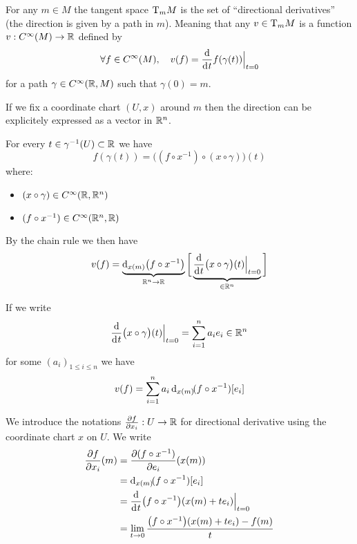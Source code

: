 		For any $m \in M$ the tangent space $\mathrm{T}_m{M}$ is the set of ``directional derivatives'' (the direction is given by a path in $m$).
		Meaning that any $v \in \mathrm{T}_m{M}$ is a function $v: C^\infty(M) \to \mathbb{R}$ defined by
		$$
			\forall f \in \Cinf(M), \quad v(f) = \frac{\d}{\di{t}} f(\gamma(t)) \Big|_{t=0}
		$$
		for a path $\gamma \in C^\infty(\mathbb{R}, M)$ such that $\gamma(0) = m$.



		If we fix a coordinate chart $(U, x)$ around $m$ then the direction can be explicitely expressed as a vector in $\mathbb{R}^n$.

		For every $t \in \gamma^{-1}(U) \subset \mathbb{R}$ we have
		$$
			f(\gamma(t)) = \big( (f \circ x^{-1}) \circ (x \circ \gamma) \big)(t)
		$$
		where:
		\begin{itemize}
			\item $(x \circ \gamma) \in C^\infty(\mathbb{R}, \mathbb{R}^n)$
			\item $(f \circ x^{-1}) \in C^\infty(\mathbb{R}^n, \mathbb{R})$
		\end{itemize}
		By the chain rule we then have
		$$
			v(f) = \underbrace{\di[x(m)] \big( f \circ x^{-1} \big)}_{\R^n \to \R} \bigg[ \underbrace{\frac{\d}{\di{t}} \big( x \circ \gamma \big)(t) \Big|_{t=0}}_{\in \R^n} \bigg]
		$$

		If we write
		$$
			\frac{\d}{\di{t}} \big( x \circ \gamma \big)(t) \Big|_{t=0} = \sum_{i=1}^n a_i e_i \in \R^n
		$$
		for some $(a_i)_{1 \leq i \leq n}$ we have
		$$
			v(f) = \sum_{i=1}^n a_i \di[x(m)](f \circ x^{-1})[e_i]
		$$

		We introduce the notations $\frac{\partial{f}}{\partial{x_i}}: U \to \mathbb{R}$ for directional derivative using the coordinate chart $x$ on $U$. We write
		\begin{align*}
			\frac{\partial{f}}{\partial{x_i}}(m) &= \frac{\partial{(f \circ x^{-1})}}{\partial{e_i}}(x(m)) \\
			                                     &= \di[x(m)](f \circ x^{-1})[e_i] \\
			                                     &= \frac{\d}{\di{t}} \big( f \circ x^{-1} \big)(x(m) + t e_i) \Big|_{t=0} \\
			                                     &= \lim_{t \to 0} \frac{\big( f \circ x^{-1} \big)(x(m) + t e_i) - f(m)}{t}
		\end{align*}

